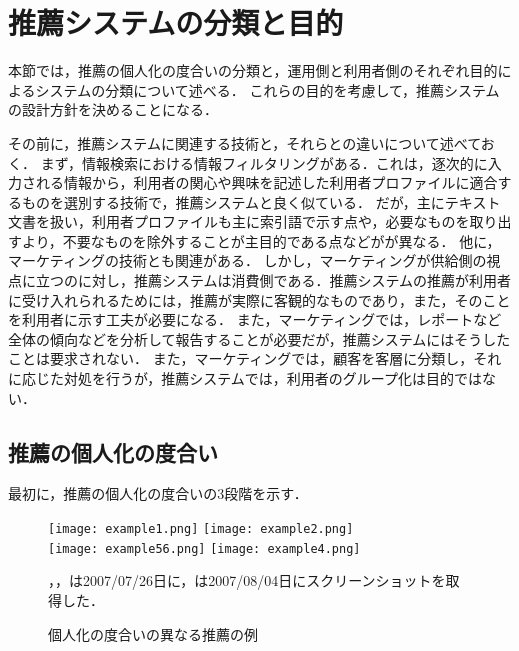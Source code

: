\chapter{推薦システムの分類と目的}
\label{chap:category}

本節では，推薦の個人化の度合いの分類と，運用側と利用者側のそれぞれ目的によるシステムの分類について述べる．
これらの目的を考慮して，推薦システムの設計方針を決めることになる．

その前に，推薦システムに関連する技術と，それらとの違いについて述べておく．
まず，情報検索における情報フィルタリングがある．これは，逐次的に入力される情報から，利用者の関心や興味を記述した利用者プロファイルに適合するものを選別する技術\cite{jb:012:00}で，推薦システムと良く似ている．
だが，主にテキスト文書を扱い，利用者プロファイルも主に索引語で示す点や，必要なものを取り出すより，不要なものを除外することが主目的である点などがが異なる．
他に，マーケティングの技術とも関連がある．
しかし，マーケティングが供給側の視点に立つのに対し，推薦システムは消費側である．推薦システムの推薦が利用者に受け入れられるためには，推薦が実際に客観的なものであり，また，そのことを利用者に示す工夫が必要になる．
また，マーケティングでは，レポートなど全体の傾向などを分析して報告することが必要だが，推薦システムにはそうしたことは要求されない．
また，マーケティングでは，顧客を客層に分類し，それに応じた対処を行うが，推薦システムでは，利用者のグループ化は目的ではない．

\section{推薦の個人化の度合い}
\label{sec:plevel}

最初に，推薦の個人化の度合いの3段階\cite{dmkd:01:01}を示す．

\begin{figure}
\centering
{}%
{\texttt{[image: example1.png]}}%
\hspace{0.08\linewidth}%
%
{\texttt{[image: example2.png]}}\\\medskip
{}%
{\texttt{[image: example56.png]}}
\hspace{0.08\linewidth}%
%
{\texttt{[image: example4.png]}}\\
\caption{個人化の度合いの異なる推薦の例}
\label{fig:plevel}
{\footnotesize{}，，は2007/07/26日に，は2007/08/04日にスクリーンショットを取得した．}
\end{figure}

